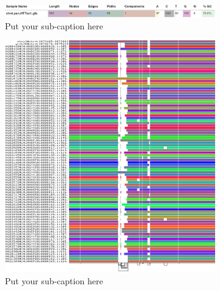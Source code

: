 \begin{figure}[h!]
	\begin{subfigure}{\linewidth}
		\centering
		\includegraphics[width=1.0\linewidth]{fig/metrics/chr4.pan.HTTex1.gfa.multiqc_odgi_stats.png}  
		\caption{Put your sub-caption here}
		\label{fig:metrics-multiqc}
	\end{subfigure}

	\begin{subfigure}{.5\linewidth}
		\centering
		\includegraphics[width=1.0\linewidth]{fig/metrics/chr4.pan.fa.a2fb268.e820cd3.9ea71d8.smooth.gfa.og.HTTex1.og.O.og.png}  
		\caption{Put your sub-caption here}
		\label{fig:sub-second}
	\end{subfigure}
	\begin{subfigure}{.5\linewidth}
	\centering

\end{subfigure}
\end{figure}
